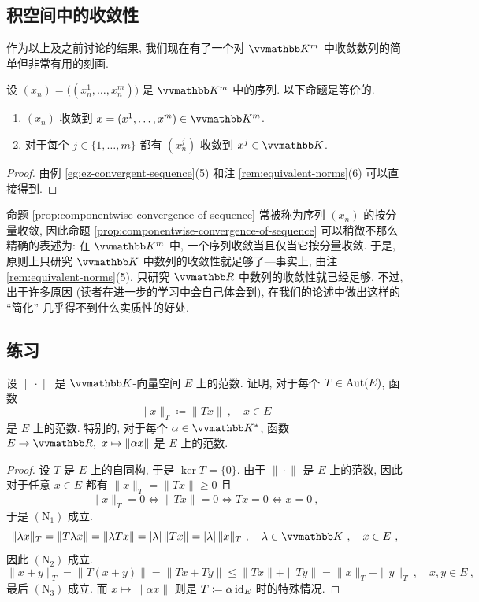 \subsection{积空间中的收敛性}

作为以上及之前讨论的结果, 我们现在有了一个对 \(\K^m\) 中收敛数列的简单但非常有用的刻画.

\begin{proposition}\label{prop:componentwise-convergence-of-sequence}
    设 \((x_n) = \bigl((x_n^1, \ldots, x_n^m)\bigr)\) 是 \(\K^m\) 中的序列. 以下命题是等价的.
    \begin{enumerate}
        \item \((x_n)\) 收敛到 \(x = (x^1, \ldots, x^m) \in \K^m\).
        \item 对于每个 \(j \in \{1, \ldots, m\}\) 都有 \((x_n^j)\) 收敛到 \(x^j \in \K\).
    \end{enumerate}
\end{proposition}

\begin{proof}
    由例 \ref{eg:ez-convergent-sequence}(5) 和注 \ref{rem:equivalent-norms}(6) 可以直接得到.
\end{proof}

命题 \ref{prop:componentwise-convergence-of-sequence} 常被称为序列 \((x_n)\) 的按分量收敛, 因此命题 \ref{prop:componentwise-convergence-of-sequence} 可以稍微不那么精确的表述为: 在 \(\K^m\) 中, 一个序列收敛当且仅当它按分量收敛. 于是, 原则上只研究 \(\K\) 中数列的收敛性就足够了---事实上, 由注 \ref{rem:equivalent-norms}(5), 只研究 \(\R\) 中数列的收敛性就已经足够. 不过, 出于许多原因 (读者在进一步的学习中会自己体会到), 在我们的论述中做出这样的 ``简化'' 几乎得不到什么实质性的好处.

\subsection{练习}

\begin{exercise}
    设 \(\|\!\cdot\!\|\) 是 \(\K\)-向量空间 \(E\) 上的范数. 证明, 对于每个 \(T \in \operatorname{Aut}(E)\), 函数
    \[
        \|x\|_T \coloneqq \|T x\|\ ,\quad x \in E
    \]
    是 \(E\) 上的范数. 特别的, 对于每个 \(\alpha \in \K^\ast\), 函数 \(E \to \R,\ x \mapsto \|\alpha x\|\) 是 \(E\) 上的范数.
\end{exercise}

\begin{proof}
    设 \(T\) 是 \(E\) 上的自同构, 于是 \(\ker T = \{0\}\). 由于 \(\|\!\cdot\!\|\) 是 \(E\) 上的范数, 因此对于任意 \(x \in E\) 都有 \(\|x\|_T = \|T x\| \geq 0\) 且
    \[
        \|x\|_T = 0 \iff \|T x\| = 0 \iff T x = 0 \iff x = 0\ ,
    \]
    于是 \((\mathrm N_1)\) 成立.
    \[
        \|\lambda x\|_T = \|T \lambda x\| = \|\lambda T x\| = |\lambda|\, \|T x\| = |\lambda|\, \|x\|_T\ ,\quad \lambda \in \K\ ,\quad x \in E\ ,
    \]
    因此 \((\mathrm N_2)\) 成立.
    \[
        \|x + y\|_T = \|T(x + y)\| = \|T x + T y\| \leq \|T x\| + \|T y\| = \|x\|_T + \|y\|_T\ ,\quad x, y \in E\ ,
    \]
    最后 \((\mathrm N_3)\) 成立. 而 \(x \mapsto \|\alpha x\|\) 则是 \(T \coloneqq \alpha \operatorname{id}_E\) 时的特殊情况.
\end{proof}


